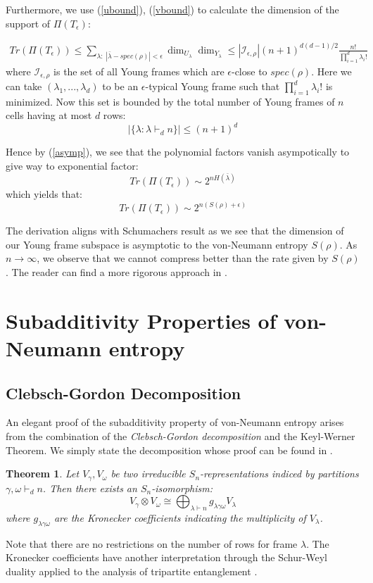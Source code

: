 \documentclass[12pt]{article}%
\newtheorem{thm}{Theorem}
\begin{document}
Furthermore, we use (\ref{ubound}), (\ref{vbound}) to calculate the dimension of the support of $\Pi(T_\epsilon)$:

\begin{gather} \label{epsilbound}
  Tr(\Pi(T_\epsilon)) \leq \sum_{\lambda: \; |\bar{\lambda} - spec(\rho)| < \epsilon} \dim_{U_\lambda} \dim_{Y_\lambda} \leq |\mathcal{I}_{\epsilon,\rho}| (n+1)^{d(d-1)/2} \frac{n!}{\prod_{i=1}^d
   \lambda_i!}
\end{gather}
where $\mathcal{I}_{\epsilon,\rho}$ is the set of all Young frames which are $\epsilon$-close to $spec(\rho)$. Here we can take $(\lambda_1,...,\lambda_d)$ to be an $\epsilon$-typical Young frame such that $\prod_{i=1}^d \lambda_i!$ is minimized. Now this set is bounded by the total number of Young frames of $n$ cells having at most $d$ rows:
$$ |\{\lambda: \lambda \vdash_d n \}| \leq (n+1)^d$$

\noindent Hence by (\ref{asymp}), we see that the polynomial factors vanish asympotically to give way to exponential factor:
$$ Tr(\Pi(T_\epsilon)) \sim 2^{nH({\bar{\lambda}})}  $$
\noindent which yields that:
$$ Tr(\Pi(T_\epsilon)) \sim 2^{n(S(\rho) + \epsilon)}  $$

The derivation aligns with Schumachers result as we see that the dimension of our Young frame subspace is asymptotic to the von-Neumann entropy $S(\rho)$. As $n \rightarrow \infty$, we observe that we cannot compress better than the rate given by $S(\rho)$. The reader can find a more rigorous approach in \cite{harrow}.

\section{Subadditivity Properties of von-Neumann entropy}

\subsection{Clebsch-Gordon Decomposition}
An elegant proof of the subadditivity property of von-Neumann entropy arises from the combination of the \textit{Clebsch-Gordon decomposition} and the Keyl-Werner Theorem. We simply state the decomposition whose proof can be found in \cite{FH}.

\begin{thm}
  Let $V_{\gamma}, V_{\omega}$ be two irreducible $S_n$-representations indiced by partitions $\gamma,\omega \vdash_d n$. Then there exists an $S_n$-isomorphism:
  $$ V_{\gamma} \otimes V_{\omega} \cong \bigoplus_{\lambda \vdash n} g_{\lambda\gamma\omega} V_{\lambda}$$ where $g_{\lambda\gamma\omega}$ are the Kronecker coefficients indicating the multiplicity of $V_\lambda$.
\end{thm}
\noindent Note that there are no restrictions on the number of rows for frame $\lambda$. The Kronecker coefficients have another interpretation through the Schur-Weyl duality applied to the analysis of tripartite entanglement \cite{CSW}.
\end{document}
